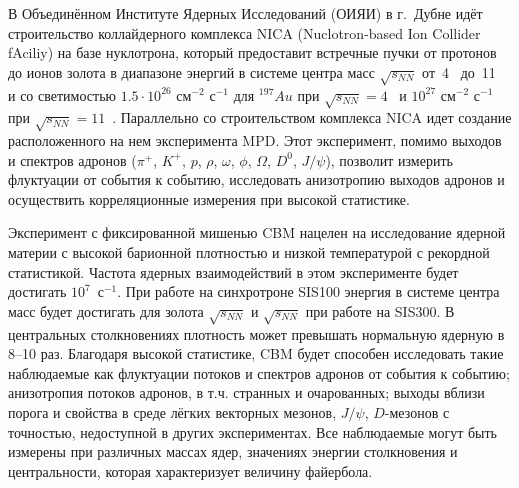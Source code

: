 
В Объединённом Институте Ядерных Исследований (ОИЯИ) в г.~Дубне идёт строительство коллайдерного комплекса NICA (Nuclotron-based Ion Collider fAciliy) на базе нуклотрона, который предоставит встречные пучки от протонов до ионов золота в диапазоне энергий в системе центра масс $\sqrt{s_{NN}}$ от~4~\GeVperNucl{} до~11~\GeVperNucl{} и со светимостью $1.5 \cdot 10^{26}$ см$^{-2}$ с$^{-1}$ для $^{197}Au$ при $\sqrt{s_{NN}}=4$~\GeVperNucl{} и $10^{27}$ см$^{-2}$ с$^{-1}$ при $\sqrt{s_{NN}}=11$~\GeVperNucl. Параллельно со строительством комплекса NICA идет создание расположенного на нем эксперимента MPD. Этот эксперимент, помимо выходов и спектров адронов ($\pi^{+}$, $K^{+}$, $p$, $\rho$, $\omega$, $\phi$, $\Omega$, $D^{0}$, $J/\psi$), позволит измерить флуктуации от события к событию, исследовать анизотропию выходов адронов и осуществить корреляционные измерения при высокой статистике.

\bigskip




Эксперимент с фиксированной мишенью CBM нацелен на исследование ядерной материи с высокой барионной плотностью и низкой температурой с рекордной статистикой. Частота ядерных взаимодействий в этом эксперименте будет достигать $10^7$~с$^{-1}$. При работе на синхротроне SIS100 энергия в системе центра масс будет достигать для золота $\sqrt{s_{NN}}$ \todo и $\sqrt{s_{NN}}$ \todo при работе на SIS300. В центральных столкновениях плотность может превышать нормальную ядерную в 8--10 раз. Благодаря высокой статистике, CBM будет способен исследовать такие наблюдаемые как флуктуации потоков и спектров адронов от события к событию; анизотропия потоков адронов, в т.ч. странных и очарованных; выходы вблизи порога и свойства в среде лёгких векторных мезонов, $J/\psi$, $D$-мезонов с точностью, недоступной в других экспериментах. Все наблюдаемые могут быть измерены при различных массах ядер, значениях энергии столкновения и центральности, которая характеризует величину файербола.

\bigskip


